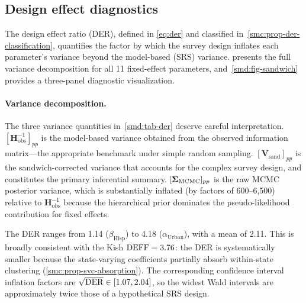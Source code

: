 
\subsection{Design effect diagnostics}
\label{smd:design-effects}

The design effect ratio (DER), defined in \eqref{eq:der} and
classified in~\cref{smc:prop-der-classification}, quantifies the
factor by which the survey design inflates each parameter's variance
beyond the model-based (SRS) variance.   presents
the full variance decomposition for all 11 fixed-effect parameters,
and~\cref{smd:fig-sandwich} provides a three-panel diagnostic
visualization.

\paragraph{Variance decomposition.}
The three variance quantities in~\cref{smd:tab-der} deserve careful
interpretation.
$[\mathbf{H}_{\mathrm{obs}}^{-1}]_{pp}$ is the model-based variance
obtained from the observed information matrix---the appropriate
benchmark under simple random sampling.
$[\mathbf{V}_{\mathrm{sand}}]_{pp}$ is the sandwich-corrected variance
\citep{Binder1983} that accounts for the complex survey design, and constitutes the
primary inferential summary.
$[\boldsymbol{\Sigma}_{\mathrm{MCMC}}]_{pp}$ is the raw MCMC posterior variance,
which is substantially inflated (by factors of 600--6{,}500) relative
to $\mathbf{H}_{\mathrm{obs}}^{-1}$ because the hierarchical prior
dominates the pseudo-likelihood contribution for fixed effects.

The DER ranges from 1.14 ($\beta_{\mathrm{Hisp}}$) to 4.18
($\alpha_{\mathrm{Urban}}$), with a mean of 2.11.  This is broadly
consistent with the Kish $\text{DEFF} = 3.76$: the DER is systematically
smaller because the state-varying coefficients partially absorb
within-state clustering (\cref{smc:prop-svc-absorption}).  The
corresponding confidence interval inflation factors are
$\sqrt{\operatorname{DER}} \in [1.07, 2.04]$, so the widest Wald intervals are
approximately twice those of a hypothetical SRS design.

